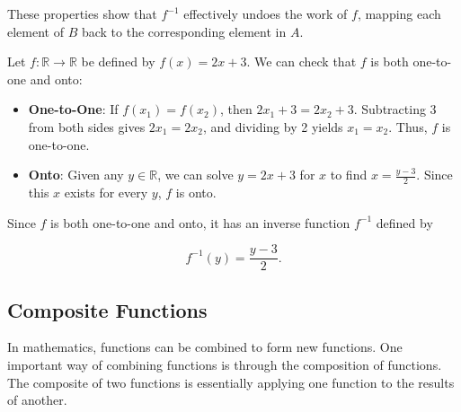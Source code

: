 These properties show that \( f^{-1} \) effectively undoes the work of \( f \), mapping each element of \( B \) back to the corresponding element in \( A \).

\begin{example}


Let \( f: \mathbb{R} \rightarrow \mathbb{R} \) be defined by \( f(x) = 2x + 3 \). We can check that \( f \) is both one-to-one and onto:

\begin{itemize}
    \item \textbf{One-to-One}: If \( f(x_1) = f(x_2) \), then \( 2x_1 + 3 = 2x_2 + 3 \). Subtracting 3 from both sides gives \( 2x_1 = 2x_2 \), and dividing by 2 yields \( x_1 = x_2 \). Thus, \( f \) is one-to-one.
    \item \textbf{Onto}: Given any \( y \in \mathbb{R} \), we can solve \( y = 2x + 3 \) for \( x \) to find \( x = \frac{y - 3}{2} \). Since this \( x \) exists for every \( y \), \( f \) is onto.
\end{itemize}

Since \( f \) is both one-to-one and onto, it has an inverse function \( f^{-1} \) defined by

\[
f^{-1}(y) = \frac{y - 3}{2}.
\]

  
\end{example}

\subsection*{Composite Functions}
In mathematics, functions can be combined to form new functions. One important way of combining functions is through the composition of functions. The composite of two functions is essentially applying one function to the results of another.


